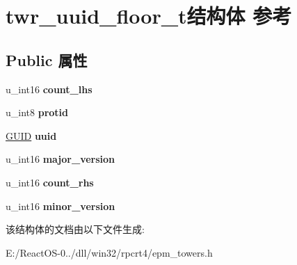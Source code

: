 \hypertarget{structtwr__uuid__floor__t}{}\section{twr\+\_\+uuid\+\_\+floor\+\_\+t结构体 参考}
\label{structtwr__uuid__floor__t}
\subsection*{Public 属性}
\begin{DoxyCompactItemize}
\item 
\mbox{\label{structtwr__uuid__floor__t_a3aef07f72e8b54ee5909f46b54d82faf}} 
u\+\_\+int16 {\bfseries count\+\_\+lhs}
\item 
\mbox{\label{structtwr__uuid__floor__t_adcc06ac7e4a88a23f563fbf9a89c8ba6}} 
u\+\_\+int8 {\bfseries protid}
\item 
\mbox{\label{structtwr__uuid__floor__t_ab2c7948dfd886f0b6ed7218173d09579}} 
\hyperlink{interface_g_u_i_d}{G\+U\+ID} {\bfseries uuid}
\item 
\mbox{\label{structtwr__uuid__floor__t_a655537a9adcdad5c47ab1cc87f76604d}} 
u\+\_\+int16 {\bfseries major\+\_\+version}
\item 
\mbox{\label{structtwr__uuid__floor__t_a4d43ede8630d048be15e8c88ae6dabb5}} 
u\+\_\+int16 {\bfseries count\+\_\+rhs}
\item 
\mbox{\label{structtwr__uuid__floor__t_a00021a23a64da1ebca1106ad394ffc3a}} 
u\+\_\+int16 {\bfseries minor\+\_\+version}
\end{DoxyCompactItemize}


该结构体的文档由以下文件生成\+:\begin{DoxyCompactItemize}
\item 
E\+:/\+React\+O\+S-\/0../dll/win32/rpcrt4/epm\+\_\+towers.\+h\end{DoxyCompactItemize}
